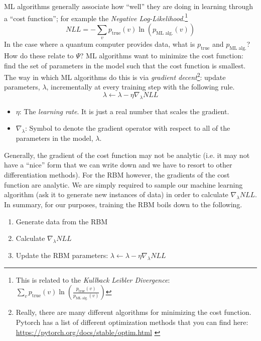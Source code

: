 \documentclass[12pt]{article}
\begin{document}
ML algorithms generally associate how ``well'' they are doing in learning through a ``cost function''; for example the {\it Negative Log-Likelihood}.\footnote{This is related to the {\it Kullback Leibler Divergence}: $\sum_{v} p_{\text{true}}(v) \ln(\frac{p_{\text{true}}(v)}{p_{\text{ML alg.}}(v)})$}
\begin{equation}
    NLL = -\sum_{v} p_{\text{true}}(v) \ln(p_{\text{ML alg.}}(v))
\end{equation}
In the case where a quantum computer provides data, what is $p_{\text{true}}$ and $p_{\text{ML alg.}}$?  How do these relate to $\Psi$?
ML algorithms want to minimize the cost function: find the set of parameters in the model such that the cost function is smallest. The way in which ML algorithms do this is via {\it gradient decent}\footnote{Really, there are many different algorithms for minimizing the cost function. Pytorch has a list of different optimization methods that you can find here: \textcolor{blue}{ \href{https://pytorch.org/docs/stable/optim.html}{https://pytorch.org/docs/stable/optim.html} }}: update parameters, $\lambda$, incrementally at every training step with the following rule.
\begin{equation}
    \lambda \leftarrow \lambda - \eta \nabla_{\lambda}NLL
\end{equation}
\begin{itemize}
    \item $\eta$: The {\it learning rate}. It is just a real number that scales the gradient.
    \item $\nabla_{\lambda}$: Symbol to denote the gradient operator with respect to all of the parameters in the model, $\lambda$.
\end{itemize}

Generally, the gradient of the cost function may not be analytic (i.e. it may not have a ``nice'' form that we can write down and we have to resort to other differentiation methods). For the RBM however, the gradients of the cost function are analytic. We are simply required to sample our machine learning algorithm (ask it to generate new instances of data) in order to calculate $\nabla_{\lambda}NLL$.
In summary, for our purposes, training the RBM boils down to the following.

\begin{enumerate}
    \item Generate data from the RBM
    \item Calculate $\nabla_{\lambda}NLL$
    \item Update the RBM parameters: $\lambda \leftarrow \lambda - \eta \nabla_{\lambda}NLL$
\end{enumerate}
\end{document}
